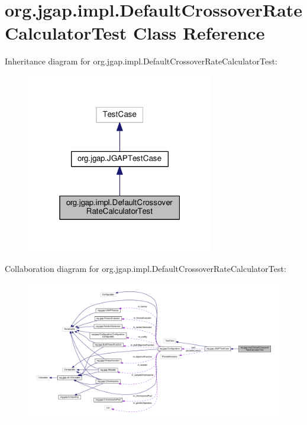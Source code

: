 \hypertarget{classorg_1_1jgap_1_1impl_1_1_default_crossover_rate_calculator_test}{\section{org.\-jgap.\-impl.\-Default\-Crossover\-Rate\-Calculator\-Test Class Reference}
\label{classorg_1_1jgap_1_1impl_1_1_default_crossover_rate_calculator_test}
}


Inheritance diagram for org.\-jgap.\-impl.\-Default\-Crossover\-Rate\-Calculator\-Test\-:
\nopagebreak
\begin{figure}[H]
\begin{center}
\leavevmode
\includegraphics[width=232pt]{classorg_1_1jgap_1_1impl_1_1_default_crossover_rate_calculator_test__inherit__graph}
\end{center}
\end{figure}


Collaboration diagram for org.\-jgap.\-impl.\-Default\-Crossover\-Rate\-Calculator\-Test\-:
\nopagebreak
\begin{figure}[H]
\begin{center}
\leavevmode
\includegraphics[width=350pt]{classorg_1_1jgap_1_1impl_1_1_default_crossover_rate_calculator_test__coll__graph}
\end{center}
\end{figure}
